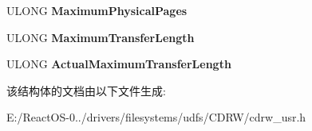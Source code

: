 \begin{DoxyCompactItemize}
\item 
\mbox{\label{struct___b_u_f_f_e_r___c_a_p_a_c_i_t_y___b_l_o_c_k___u_s_e_r___o_u_t_af546f812ef695a5d93c9b02c8d470e8e}} 
U\+L\+O\+NG {\bfseries Maximum\+Physical\+Pages}
\item 
\mbox{\label{struct___b_u_f_f_e_r___c_a_p_a_c_i_t_y___b_l_o_c_k___u_s_e_r___o_u_t_aa6fc358465d570298f5775871945e9b4}} 
U\+L\+O\+NG {\bfseries Maximum\+Transfer\+Length}
\item 
\mbox{\label{struct___b_u_f_f_e_r___c_a_p_a_c_i_t_y___b_l_o_c_k___u_s_e_r___o_u_t_a74132b001deef37f70878c58d23bcd50}} 
U\+L\+O\+NG {\bfseries Actual\+Maximum\+Transfer\+Length}
\end{DoxyCompactItemize}


该结构体的文档由以下文件生成\+:\begin{DoxyCompactItemize}
\item 
E\+:/\+React\+O\+S-\/0../drivers/filesystems/udfs/\+C\+D\+R\+W/cdrw\+\_\+usr.\+h\end{DoxyCompactItemize}
